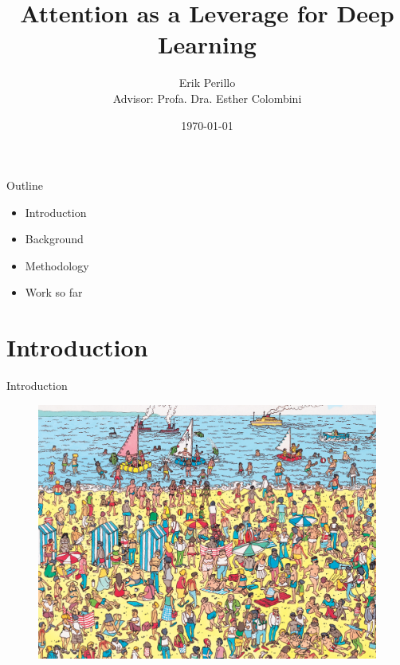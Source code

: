 \documentclass[10pt]{beamer}
\title{Attention as a Leverage for Deep Learning}
\subtitle{}
\author{Erik Perillo\\
Advisor: Profa. Dra. Esther Colombini}
\date{\today}
\institute{Institute of Computing - Unicamp - Brazil}
\begin{document}
\maketitle

\begin{frame}{Outline}
    \begin{itemize}
        \item Introduction
        \item Background
        \item Methodology
        \item Work so far
    \end{itemize}
\end{frame}

\section{Introduction}

\begin{frame}{Introduction}
    \begin{figure}
        \centering
        \includegraphics[width=1.0\linewidth]{./img/wheres_wally.jpg}
    \end{figure}
\end{frame}
\end{document}
